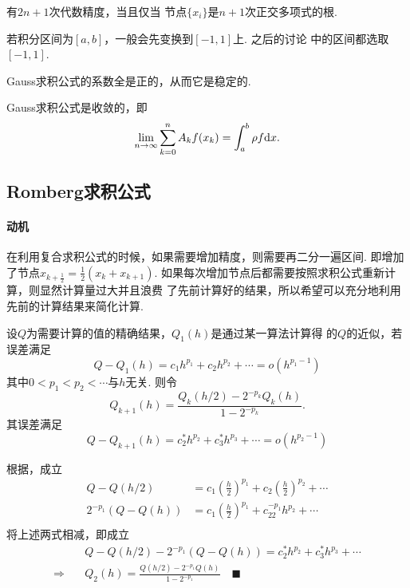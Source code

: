   \begin{cor}
    有$2n+1$次代数精度，当且仅当
    节点$\{x_i\}$是$n+1$次正交多项式的根.
  \end{cor}
  \remark
    若积分区间为$[a, b]$，一般会先变换到$[-1, 1]$上. 之后的讨论
    中的区间都选取$[-1, 1]$.

  \begin{pos}
    Gauss求积公式的系数全是正的，从而它是稳定的.
  \end{pos}

  \begin{thm}
      Gauss求积公式是收敛的，即
      \[
        \lim_{n\to\infty}\sum_{k=0}^nA_k\mathnormal{f}(x_k)
        = \int_a^b\rho\mathnormal{f}\mathrm{d} x.
      \]
  \end{thm}

\subsection{Romberg求积公式}
  \paragraph{动机}
    在利用复合求积公式的时候，如果需要增加精度，则需要再二分一遍区间.
    即增加了节点$x_{k+\frac{1}{2}} = \frac{1}{2}(x_k + x_{k+1})$.
    如果每次增加节点后都需要按照求积公式重新计算，则显然计算量过大并且浪费
    了先前计算好的结果，所以希望可以充分地利用先前的计算结果来简化计算.

  \begin{alg}[Richardson外推方法]
    设$Q$为需要计算的值的精确结果，$Q_1(h)$是通过某一算法计算得
    的$Q$的近似，若误差满足
    \begin{equation}
      \label{equ: Q-Q(h)}
      Q-Q_1(h) = c_1h^{p_1} + c_2h^{p_2} + \cdots = o(h^{p_1-1})
    \end{equation}
    其中$0<p_1<p_2<\cdots$与$h$无关. 则令
    \[
      Q_{k+1}(h) = \frac{Q_k(h/2) - 2^{-p_k}Q_k(h)}{1-2^{-p_k}}.
    \]
    其误差满足
    \[
      Q-Q_{k+1}(h) = c_2^*h^{p_2} + c_3^*h^{p_3} + \cdots = o(h^{p_2-1})
    \]
  \end{alg}
  \proof
    根据，成立
    \[\begin{split}
      Q - Q(h/2) &= c_1\left(\frac{h}{2}\right)^{p_1} + c_2\left(\frac{h}{2}\right)^{p_2} + \cdots\\
      2^{-p_1}(Q-Q(h)) &= c_1\left(\frac{h}{2}\right)^{p_1} + c_22^{-p_1}h^{p_2} + \cdots\\
    \end{split}\]
    将上述两式相减，即成立
    \[\begin{split}
      &Q-Q(h/2) - 2^{-p_1}(Q-Q(h)) = c_2^*h^{p_2} + c_3^*h^{p_3} + \cdots\\
      \Rightarrow\quad&
      Q_2(h) = \frac{Q(h/2) - 2^{-p_1}Q(h)}{1-2^{-p_1}}\quad\blacksquare
    \end{split}\]

